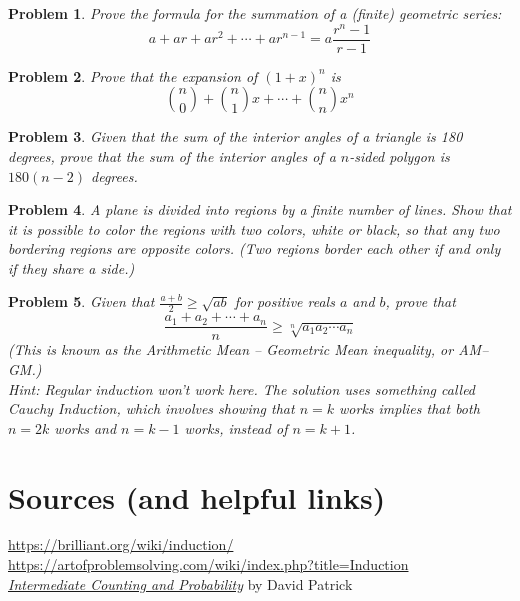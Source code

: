 \documentclass[a4paper]{scrartcl}
\newtheorem{u_problem}{Problem}
\begin{document}
\begin{u_problem}
	Prove the formula for the summation of a (finite) geometric series:
	\[a + ar + ar^2 + \cdots + ar^{n-1} = a\frac{r^n - 1}{r-1}\]
\end{u_problem}

\begin{u_problem}
	Prove that the expansion of ${\left(1 + x\right)}^n$ is
	\[\binom{n}{0} + \binom{n}{1}x + \cdots + \binom{n}{n}x^n\]
\end{u_problem}

\begin{u_problem}
	Given that the sum of the interior angles of a triangle is 180 degrees, prove that the sum of the interior angles of a $n$-sided polygon is $180(n-2)$ degrees.
\end{u_problem}

\begin{u_problem}
	A plane is divided into regions by a finite number of lines. Show that it is possible to color the regions with two colors, white or black, so that any two bordering regions are opposite colors. (Two regions border each other if and only if they share a side.)
\end{u_problem}

\begin{u_problem}
	Given that $\frac{a+b}{2} \geq \sqrt{ab}$ for positive reals $a$ and $b$, prove that \[\frac{a_1 + a_2 + \cdots + a_n}{n} \geq \sqrt[n]{a_1 a_2 \cdots a_n}\] (This is known as the Arithmetic Mean -- Geometric Mean inequality, or AM--GM.)  \\
	Hint: Regular induction won't work here. The solution uses something called Cauchy Induction, which involves showing that $n=k$ works implies that both $n=2k$ works and $n=k-1$ works, instead of $n=k+1$.
\end{u_problem}
\section{Sources (and helpful links)}
\url{https://brilliant.org/wiki/induction/} \\
\url{https://artofproblemsolving.com/wiki/index.php?title=Induction} \\
\href{https://artofproblemsolving.com/store/book/intermediate-counting}{\emph{Intermediate Counting and Probability}} by David Patrick
\end{document}
